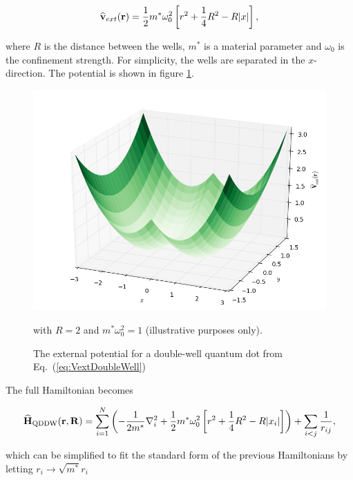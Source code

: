 \begin{equation}
 {\bf\widehat{v}}_{ext}(\mathbf{r}) = \frac{1}{2}m^\ast \omega_0^2 \left[r^2 + \frac{1}{4}R^2 - R|x|\right], \label{eq:VextDoubleWell}
\end{equation}

where $R$ is the distance between the wells, $m^\ast$ is a material parameter and $\omega_0$ is the confinement strength. For simplicity, the wells are separated in the $x$-direction. The potential is shown in figure \ref{fig:extPotDoubleWell}.

\begin{figure}
 \begin{center}
  \includegraphics[scale=0.5]{../Graphics/Potentials/doubleWell.png}
  \caption{The external potential for a double-well quantum dot from Eq.~(\ref{eq:VextDoubleWell})} with $R=2$ and $m^\ast\omega_0^2 = 1$ (illustrative purposes only).
  \label{fig:extPotDoubleWell}
 \end{center}
\end{figure}

The full Hamiltonian becomes

\begin{equation}
  {\bf\widehat{H}}_{\mathrm{QDDW}}(\mathbf{r}, \mathbf{R}) = \sum_{i=1}^N \left(-\frac{1}{2m^\ast}\nabla_i^2 + \frac{1}{2}m^\ast \omega_0^2 \left[r^2 + \frac{1}{4}R^2 - R|x_i|\right]  \right) + \sum_{i<j} \frac{1}{r_{ij}},
\end{equation}

which can be simplified to fit the standard form of the previous Hamiltonians by letting $r_i\to\sqrt{m^\ast}r_i$


